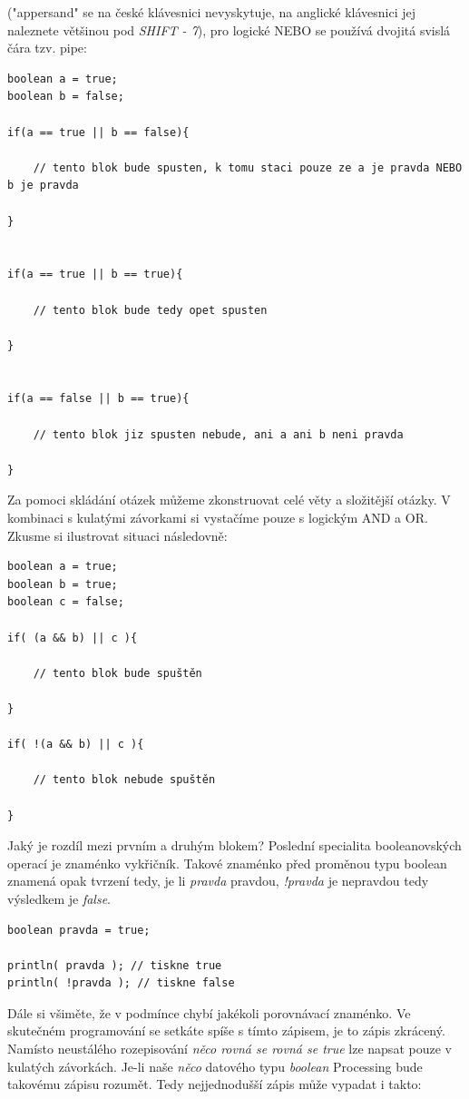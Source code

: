 \documentclass[11pt]{book}
\newcommand{\klavesy}[1]{\textsc{\em #1}}
\begin{document}
("appersand" se na české klávesnici nevyskytuje, na anglické klávesnici jej naleznete většinou pod \klavesy {SHIFT - 7}), pro logické NEBO se používá dvojitá svislá čára tzv. pipe:

\begin{lstlisting}
boolean a = true;
boolean b = false;

if(a == true || b == false){

	// tento blok bude spusten, k tomu staci pouze ze a je pravda NEBO b je pravda

}


if(a == true || b == true){

	// tento blok bude tedy opet spusten

}


if(a == false || b == true){

	// tento blok jiz spusten nebude, ani a ani b neni pravda 

}

\end{lstlisting}

Za pomoci skládání otázek můžeme zkonstruovat celé věty a složitější otázky. V kombinaci s kulatými závorkami si vystačíme pouze s logickým AND a OR. Zkusme si ilustrovat situaci následovně:


\begin{lstlisting}
boolean a = true;
boolean b = true;
boolean c = false;

if( (a && b) || c ){

	// tento blok bude spuštěn
	
}

if( !(a && b) || c ){

	// tento blok nebude spuštěn
	
}

\end{lstlisting}

Jaký je rozdíl mezi prvním a druhým blokem? Poslední specialita booleanovských operací je znaménko vykřičník. Takové znaménko před proměnou typu boolean znamená opak tvrzení tedy, je li {\em pravda} pravdou, {\em !pravda} je nepravdou tedy výsledkem je {\em false}.


\begin{lstlisting}
boolean pravda = true;

println( pravda ); // tiskne true
println( !pravda ); // tiskne false
\end{lstlisting}



Dále si všiměte, že v podmínce chybí jakékoli porovnávací znaménko. Ve skutečném programování se setkáte spíše s tímto zápisem, je to zápis zkrácený. Namísto neustálého rozepisování {\em něco rovná se rovná se true} lze napsat pouze v kulatých závorkách. Je-li naše {\em něco} datového typu {\em boolean} Processing bude takovému zápisu rozumět. Tedy nejjednodušší zápis může vypadat i takto:
\end{document}
